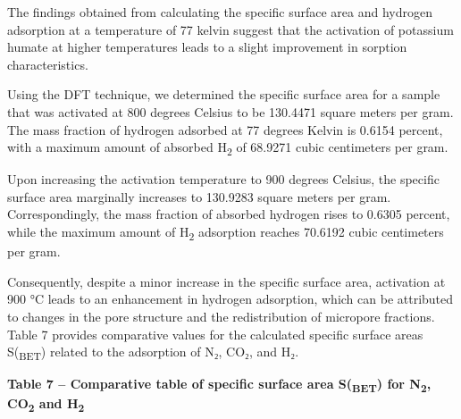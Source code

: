 The findings obtained from calculating the specific surface area and
hydrogen adsorption at a temperature of 77 kelvin suggest that the
activation of potassium humate at higher temperatures leads to a slight
improvement in sorption characteristics.

Using the DFT technique, we determined the specific surface area for a
sample that was activated at 800 degrees Celsius to be 130.4471 square
meters per gram. The mass fraction of hydrogen adsorbed at 77 degrees
Kelvin is 0.6154 percent, with a maximum amount of absorbed
H\textsubscript{2} of 68.9271 cubic centimeters per gram.

Upon increasing the activation temperature to 900 degrees Celsius, the
specific surface area marginally increases to 130.9283 square meters per
gram. Correspondingly, the mass fraction of absorbed hydrogen rises to
0.6305 percent, while the maximum amount of H\textsubscript{2}
adsorption reaches 70.6192 cubic centimeters per gram.

Consequently, despite a minor increase in the specific surface area,
activation at 900 °C leads to an enhancement in hydrogen adsorption,
which can be attributed to changes in the pore structure and the
redistribution of micropore fractions. Table 7 provides comparative
values for the calculated specific surface areas S(\textsubscript{BET})
related to the adsorption of N₂, CO₂, and H₂.

{\bfseries Table 7 -- Comparative table of specific surface area
S(\textsubscript{BET}) for N\textsubscript{2}, CO\textsubscript{2} and
H\textsubscript{2}}

